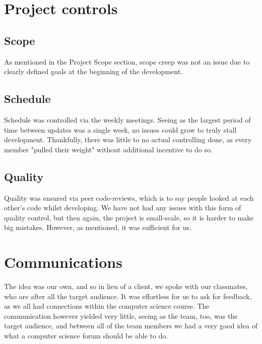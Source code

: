 \documentclass[a4paper, 12pt]{article}
\begin{document}
	\section{Project controls}
		\subsection{Scope}
			\par As mentioned in the Project Scope section, scope creep was not an issue due to clearly defined goals at the beginning of
			the development. 
		\subsection{Schedule}
			\par Schedule was controlled via the weekly meetings. Seeing as the largest period of time between updates was a single week,
			no issues could grow to truly stall development. Thankfully, there was little to no actual controlling done, as every member
			"pulled their weight" without additional incentive to do so.
		\subsection{Quality}
			\par Quality was ensured via peer code-reviews, which is to say people looked at each other's code whilst developing. We have
			not had any issues with this form of quality control, but then again, the project is small-scale, so it is harder to make 
			big mistakes. However, as mentioned, it was sufficient for us.
	\section{Communications}
		\par The idea was our own, and so in lieu of a client, we spoke with our classmates, who are after all the target audience. It was
		effortless for us to ask for feedback, as we all had connections within the computer science course. The communication however
		yielded very little, seeing as the team, too, was the target audience, and between all of the team members we had a very good
		idea of what a computer science forum should be able to do.
\end{document}
